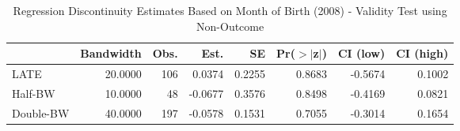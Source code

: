 \begin{table}[ht]
\centering
\begin{tabular}{lrrrrrrr}
  \hline
 & Bandwidth & Obs. & Est. & SE & Pr($>$$|$z$|$) & CI (low) & CI (high) \\ 
  \hline
LATE & 20.0000 & 106 & 0.0374 & 0.2255 & 0.8683 & -0.5674 & 0.1002 \\ 
  Half-BW & 10.0000 & 48 & -0.0677 & 0.3576 & 0.8498 & -0.4169 & 0.0821 \\ 
  Double-BW & 40.0000 & 197 & -0.0578 & 0.1531 & 0.7055 & -0.3014 & 0.1654 \\ 
   \hline
\end{tabular}
\caption{Regression Discontinuity Estimates Based on Month of Birth (2008) - Validity Test using Non-Outcome} 
\label{tab:rd2008m_non}
\end{table}
